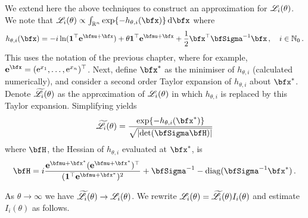 \begin{subappendices}
We extend here the above techniques to construct an approximation
for $\mathscr{L}_i(\theta)$. We note that $\Laplace_i(\theta) \propto \int_{\RL^n} \exp\{ -h_{\theta,i}(\bfx) \} \dd \bfx $ where
\[ h_{\theta,i}(\bfx) = - i \ln(\bfone^\tr \ve^{\bfmu + \bfx}) + \theta \bfone^\tr \ve^{\bfmu + \bfx} + \frac12 \bfx^\tr \bfSigma^{-1} \bfx \,, \quad i \in \NZ \,. \]
This uses the notation of the previous chapter, where for example, $\ve^{\bfx} = (\e^{x_1}, \dots, \e^{x_n})^\top$. Next, define $\bfx^*$ as the minimiser of $h_{\theta,i}$ (calculated numerically), and consider a second order Taylor expansion of $h_{\theta,i}$ about $\bfx^*$. Denote $\widetilde{\mathscr{L}}_i(\theta)$ as the approximation of $\mathscr{L}_i(\theta)$ in which $h_{\theta,i}$ is replaced by this Taylor expansion. Simplifying yields
\begin{equation} \label{firstTerm}
	\widetilde{\Laplace}_i(\theta) = \frac{ \exp\{-h_{\theta,i}(\bfx^*)\} }{ \sqrt{ \abs{\det(\bfSigma \bfH)} }}
\end{equation}
where $\bfH$, the Hessian of $h_{\theta,i}$ evaluated at $\bfx^*$, is
\[ \bfH = i\frac{\ve^{\bfmu + \bfx^*} (\ve^{\bfmu + \bfx^*})^\tr}{(\bfone^\tr \ve^{\bfmu + \bfx^*})^2} + \bfSigma^{-1} - \diag(\bfSigma^{-1} \bfx^*) \,. \]

As $\theta \to \infty$ we have $\widetilde{\mathscr{L}}_i(\theta) \to \mathscr{L}_i(\theta)$. We rewrite $\mathscr{L}_i(\theta) = \widetilde{\mathscr{L}}_i(\theta) I_i(\theta)$ and estimate $I_i(\theta)$ as follows.


\end{subappendices}

